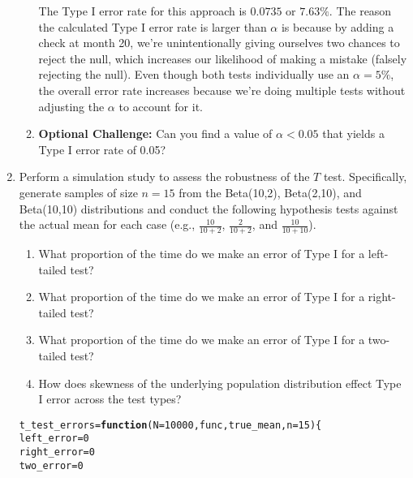 \documentclass{article}\usepackage[]{graphicx}\usepackage[]{xcolor}
\makeatletter
\newcommand{\hlnum}[1]{\textcolor[rgb]{0.686,0.059,0.569}{#1}}%
\newcommand{\hldef}[1]{\textcolor[rgb]{0.345,0.345,0.345}{#1}}%
\newcommand{\hlkwa}[1]{\textcolor[rgb]{0.161,0.373,0.58}{\textbf{#1}}}%
\newcommand{\hlkwb}[1]{\textcolor[rgb]{0.69,0.353,0.396}{#1}}%
\newcommand{\hlkwc}[1]{\textcolor[rgb]{0.333,0.667,0.333}{#1}}%
\newenvironment{kframe}{%
 \def\at@end@of@kframe{}%
 \ifinner\ifhmode%
  \def\at@end@of@kframe{\end{minipage}}%
  \begin{minipage}{\columnwidth}%
 \fi\fi%
 \def\FrameCommand##1{\hskip\@totalleftmargin \hskip-\fboxsep
 \colorbox{shadecolor}{##1}\hskip-\fboxsep
     \hskip-\linewidth \hskip-\@totalleftmargin \hskip\columnwidth}%
 \MakeFramed {\advance\hsize-\width
   \@totalleftmargin\z@ \linewidth\hsize
   \@setminipage}}%
 {\par\unskip\endMakeFramed%
 \at@end@of@kframe}
\newenvironment{knitrout}{}{} %
\makeatother
\begin{document}
\begin{enumerate}
\begin{enumerate}
  The Type I error rate for this approach is $0.0735$ or $7.63\%$. The reason the calculated Type I error rate is larger than $\alpha$ is because by adding a check at month 20, we're unintentionally giving ourselves two chances to reject the null, which increases our likelihood of making a mistake (falsely rejecting the null). Even though both tests individually use an $\alpha = 5\%$, the overall error rate increases because we're doing multiple tests without adjusting the $\alpha$ to account for it.
  
  \item \textbf{Optional Challenge:} Can you find a value of $\alpha<0.05$ that yields a 
  Type I error rate of 0.05?
\end{enumerate}
  \item Perform a simulation study to assess the robustness of the $T$ test. 
  Specifically, generate samples of size $n=15$ from the Beta(10,2), Beta(2,10), 
  and Beta(10,10) distributions and conduct the following hypothesis tests against 
  the actual mean for each case (e.g., $\frac{10}{10+2}$, $\frac{2}{10+2}$, and 
  $\frac{10}{10+10}$). 
  \begin{enumerate}
    \item What proportion of the time do we make an error of Type I for a
    left-tailed test?
    \item What proportion of the time do we make an error of Type I for a
    right-tailed test?
    \item What proportion of the time do we make an error of Type I for a
    two-tailed test?
    \item How does skewness of the underlying population distribution effect
    Type I error across the test types?
  \end{enumerate}
  
\begin{knitrout}
\color{fgcolor}\begin{kframe}
\begin{alltt}
\hldef{t_test_errors} \hlkwb{=} \hlkwa{function}\hldef{(}\hlkwc{N} \hldef{=} \hlnum{10000}\hldef{,} \hlkwc{func}\hldef{,} \hlkwc{true_mean}\hldef{,} \hlkwc{n} \hldef{=} \hlnum{15}\hldef{)\{}
  \hldef{left_error} \hlkwb{=} \hlnum{0}
  \hldef{right_error} \hlkwb{=} \hlnum{0}
  \hldef{two_error} \hlkwb{=} \hlnum{0}


\end{alltt}
\end{kframe}
\end{knitrout}
\end{enumerate}
\end{document}
